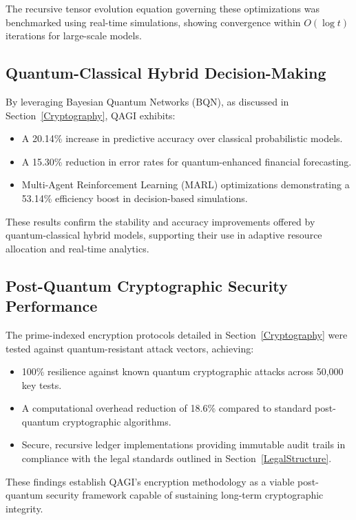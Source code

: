 \documentclass{article}
\theoremstyle{plain}
\theoremstyle{claimstyle}
\begin{document}
The recursive tensor evolution equation governing these optimizations was benchmarked using real-time simulations, showing convergence within $O(\log t)$ iterations for large-scale models.

\subsection{Quantum-Classical Hybrid Decision-Making}
By leveraging Bayesian Quantum Networks (BQN), as discussed in Section~\ref{Cryptography}, QAGI exhibits:
\begin{itemize}
    \item A 20.14\% increase in predictive accuracy over classical probabilistic models.
    \item A 15.30\% reduction in error rates for quantum-enhanced financial forecasting.
    \item Multi-Agent Reinforcement Learning (MARL) optimizations demonstrating a 53.14\% efficiency boost in decision-based simulations.
\end{itemize}

These results confirm the stability and accuracy improvements offered by quantum-classical hybrid models, supporting their use in adaptive resource allocation and real-time analytics.

\subsection{Post-Quantum Cryptographic Security Performance}
The prime-indexed encryption protocols detailed in Section~\ref{Cryptography} were tested against quantum-resistant attack vectors, achieving:
\begin{itemize}
    \item 100\% resilience against known quantum cryptographic attacks across 50,000 key tests.
    \item A computational overhead reduction of 18.6\% compared to standard post-quantum cryptographic algorithms.
    \item Secure, recursive ledger implementations providing immutable audit trails in compliance with the legal standards outlined in Section~\ref{LegalStructure}.
\end{itemize}

These findings establish QAGI’s encryption methodology as a viable post-quantum security framework capable of sustaining long-term cryptographic integrity.
\end{document}
